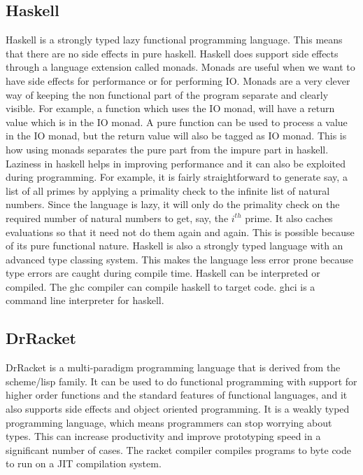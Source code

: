 \subsection{Haskell}
Haskell is a strongly typed lazy functional programming language. This means
that there are no side effects in pure haskell. Haskell does support side 
effects through a language extension called monads. Monads are useful when 
we want to have side effects for performance or for performing IO. Monads 
are a very clever way of keeping the non functional part of the program 
separate and clearly visible. For example, a function which uses the IO 
monad, will have a return value which is in the IO monad. A pure function 
can be used to process a value in the IO monad, but the return value will 
also be tagged as IO monad. This is how using monads separates the pure part
from the impure part in haskell. Laziness in haskell helps in improving 
performance and it can also be exploited during programming. For example, it
is fairly straightforward to generate say, a list of all primes by applying 
a primality check to the infinite list of natural numbers. Since the language
is lazy, it will only do the primality check on the required number of 
natural numbers to get, say, the $i^{th}$ prime. It also caches evaluations 
so that it need not do them again and again. This is possible because of its
pure functional nature. Haskell is also a strongly typed language with an 
advanced type classing system. This makes the language less error prone because
type errors are caught during compile time. %
Haskell can be interpreted or compiled. The ghc compiler can compile haskell 
to target code. ghci is a command line interpreter for haskell.

\subsection{DrRacket}
DrRacket is a multi-paradigm programming language that is derived from the
scheme/lisp family. It can be used to do functional programming with support
for higher order functions and the standard features of functional languages, 
and it also supports side effects and object oriented programming. It is a
weakly typed programming language, which means programmers can stop worrying 
about types. This can increase productivity and improve prototyping speed
in a significant number of cases. %
The racket compiler compiles programs to byte code to run on a JIT
compilation system.

